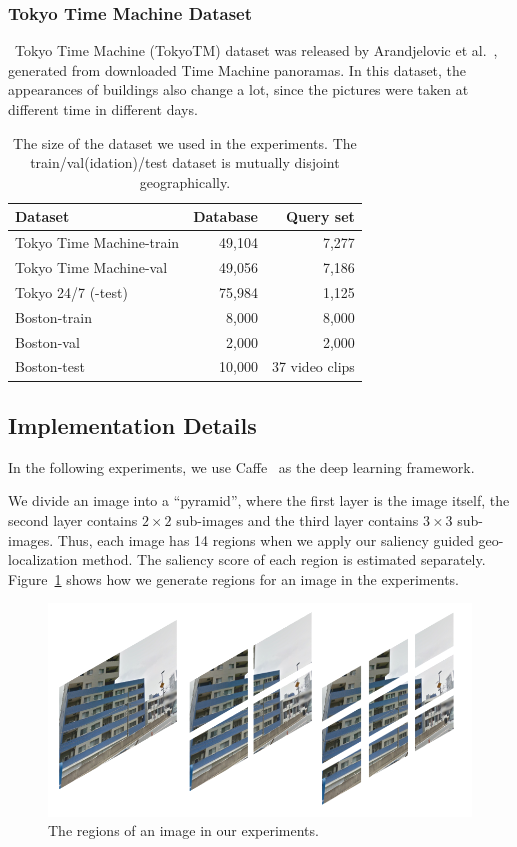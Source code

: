 \subsubsection{Tokyo Time Machine Dataset} 
~Tokyo Time Machine (TokyoTM) dataset was released by Arandjelovic et al.~\cite{Arandjelovic16}, generated  from  downloaded  Time  Machine  panoramas. 
In this dataset, the appearances of buildings also change a lot, since the pictures were taken at different time in different days.

\begin{table}[htbp]
\begin{tabular}{l|rr}
Dataset & Database & Query set \\
\hline
\hline
Tokyo Time Machine-train & 49,104 & 7,277 \\
Tokyo Time Machine-val & 49,056 & 7,186 \\
Tokyo 24/7 (-test) & 75,984 & 1,125\\
\hline
Boston-train & 8,000 & 8,000 \\
Boston-val & 2,000 & 2,000 \\
Boston-test & 10,000 & 37 video clips
\end{tabular}
\caption{The size of the dataset we used in the experiments. The train/val(idation)/test dataset is mutually disjoint geographically.}
\label{table:dataset}
\end{table}


\subsection{Implementation Details}
In the following experiments, we use Caffe~\cite{jia2014caffe} as the deep learning framework.

We divide an image into a ``pyramid'', where the first layer is the image itself, the second layer contains $2 \times 2$ sub-images and the third layer contains $3 \times 3$ sub-images. 
Thus, each image has 14 regions when we apply our saliency guided geo-localization method. The saliency score of each region is estimated separately. 
Figure~\ref{fig:regions} shows how we generate regions for an image in the experiments. 

\begin{figure}[htbp]
\includegraphics[width=0.8\linewidth]{img/regions}
\caption{The regions of an image in our experiments.}
\label{fig:regions}
\end{figure}

